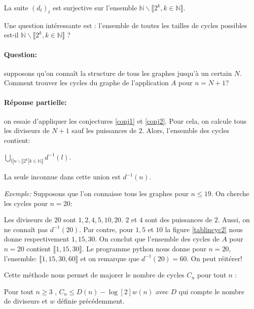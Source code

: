 \begin{conj}
La suite $(d_t)_t$ est surjective sur l'ensemble $\mathbb{N} \backslash \llbracket 2^k , k \in \mathbb{N} \rrbracket$. \newline
\end{conj}

\begin{rem}
Une question int\'eressante est : l'ensemble de toutes les tailles de cycles possibles est-il $\mathbb{N} \backslash \llbracket 2^k , k \in \mathbb{N} \rrbracket$ ?

\paragraph{Question:} supposons qu'on connaît la structure de tous les graphes jusqu'\`a un certain $N$. Comment trouver les cycles du graphe de l'application $A$ pour $n=N+1$? 

\paragraph{R\'eponse partielle:} on essaie d'appliquer les conjectures \ref{conj1} et \ref{conj2}. Pour cela, on calcule tous les diviseurs de $N+1$ sauf les puissances de $2$. Alors, l'ensemble des cycles contient:

$\bigcup\limits_{l|n \backslash \llbracket  2^k | k \in \mathbb{N} \rrbracket} d^{-1}(l)$.

La seule inconnue dans cette union est $d^{-1}(n)$.

\textit{Exemple:} Supposons que l'on connaisse tous les graphes pour $n \leqslant 19$. On cherche les cycles pour $n=20:$

Les diviseurs de 20 sont $1,2,4,5,10,20$. $2$ et $4$ sont des puissances de $2$. Aussi, on ne conna\^it pas  $d^{-1}(20)$. Par contre, pour $1,5$ et $10$ la figure \ref{tablincyc2} nous donne respectivement $1,15,30$. On conclut que l'ensemble des cycles de $A$ pour $n=20$ contient $\llbracket 1,15,30 \rrbracket$. Le programme python nous donne pour $n=20$, l'ensemble: $\llbracket 1,15,30,60 \rrbracket$ et on remarque que $d^{-1}(20) = 60$. On peut r\'eit\'erer!

Cette m\'ethode nous permet de majorer le nombre de cycles $C_n$ pour tout $n$ :
\end{rem}

\begin{lem}
Pour tout $n \geqslant 3$ , $C_n \leqslant D(n)-\log[2]{w(n)}$ avec $D$ qui compte le nombre de diviseurs et $w$ d\'efinie pr\'ec\'edemment.
\end{lem}

